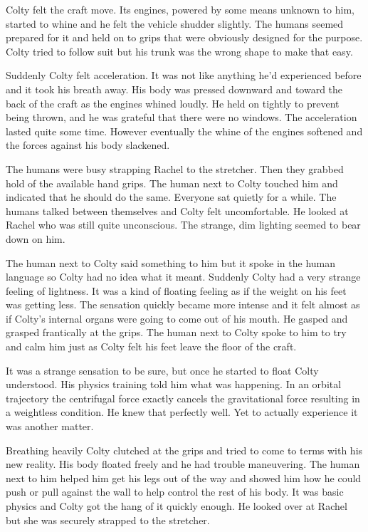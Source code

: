 Colty felt the craft move. Its engines, powered by some means unknown to him, started to whine
and he felt the vehicle shudder slightly. The humans seemed prepared for it and held on to grips
that were obviously designed for the purpose. Colty tried to follow suit but his trunk was the
wrong shape to make that easy.

Suddenly Colty felt acceleration. It was not like anything he'd experienced before and it took
his breath away. His body was pressed downward and toward the back of the craft as the engines
whined loudly. He held on tightly to prevent being thrown, and he was grateful that there were
no windows. The acceleration lasted quite some time. However eventually the whine of the engines
softened and the forces against his body slackened.

The humans were busy strapping Rachel to the stretcher. Then they grabbed hold of the available
hand grips. The human next to Colty touched him and indicated that he should do the same.
Everyone sat quietly for a while. The humans talked between themselves and Colty felt
uncomfortable. He looked at Rachel who was still quite unconscious. The strange, dim lighting
seemed to bear down on him.

The human next to Colty said something to him but it spoke in the human language so Colty had no
idea what it meant. Suddenly Colty had a very strange feeling of lightness. It was a kind of
floating feeling as if the weight on his feet was getting less. The sensation quickly became
more intense and it felt almost as if Colty's internal organs were going to come out of his
mouth. He gasped and grasped frantically at the grips. The human next to Colty spoke to him to
try and calm him just as Colty felt his feet leave the floor of the craft.

It was a strange sensation to be sure, but once he started to float Colty understood. His
physics training told him what was happening. In an orbital trajectory the centrifugal force
exactly cancels the gravitational force resulting in a weightless condition. He knew that
perfectly well. Yet to actually experience it was another matter.

Breathing heavily Colty clutched at the grips and tried to come to terms with his new reality.
His body floated freely and he had trouble maneuvering. The human next to him helped him get his
legs out of the way and showed him how he could push or pull against the wall to help control
the rest of his body. It was basic physics and Colty got the hang of it quickly enough. He
looked over at Rachel but she was securely strapped to the stretcher.

